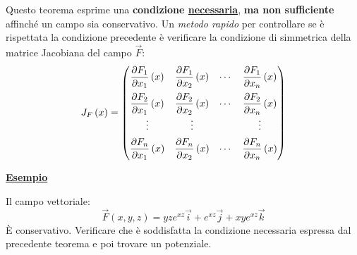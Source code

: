 \documentclass[a4paper]{article}
\makeatletter
\newcommand{\example}[1]{\textcolor{Green4}{\textbf{#1}}}
\newenvironment{rowequmat}[1]{\left(\array{@{}#1@{}}}{\endarray\right)}
\makeatother
\begin{document}
	\noindent
	Questo teorema esprime una \textbf{condizione \underline{necessaria}}, \textbf{ma non sufficiente} affinché un campo sia conservativo. Un \emph{metodo rapido} per controllare se è rispettata la condizione precedente è verificare la condizione di simmetrica della matrice Jacobiana del campo $\overset{\rightarrow}{F}$:
	\begin{equation*}
		J_{F}\left(x\right) = \begin{rowequmat}{cccc}
			\dfrac{\partial F_{1}}{\partial x_{1}}\left(x\right) & \dfrac{\partial F_{1}}{\partial x_{2}}\left(x\right) & \cdots & \dfrac{\partial F_{1}}{\partial x_{n}}\left(x\right) \\ [1em]
			\dfrac{\partial F_{2}}{\partial x_{1}}\left(x\right) & \dfrac{\partial F_{2}}{\partial x_{2}}\left(x\right) & \cdots & \dfrac{\partial F_{2}}{\partial x_{n}}\left(x\right) \\ [.5em]
			\vdots & \vdots & & \vdots \\ [.5em]
			\dfrac{\partial F_{n}}{\partial x_{1}}\left(x\right) & \dfrac{\partial F_{n}}{\partial x_{2}}\left(x\right) & \cdots & \dfrac{\partial F_{n}}{\partial x_{n}}\left(x\right)
		\end{rowequmat}
	\end{equation*}

	\begin{flushleft}
		\example{\underline{Esempio}}
	\end{flushleft}
	Il campo vettoriale:
	\begin{equation*}
		\overset{\rightarrow}{F}\left(x,y,z\right) = yze^{xz}\overset{\rightarrow}{i} + e^{xz}\overset{\rightarrow}{j} + xye^{xz}\overset{\rightarrow}{k}
	\end{equation*}
	È conservativo. Verificare che è soddisfatta la condizione necessaria espressa dal precedente teorema e poi trovare un potenziale.\newline
\end{document}
